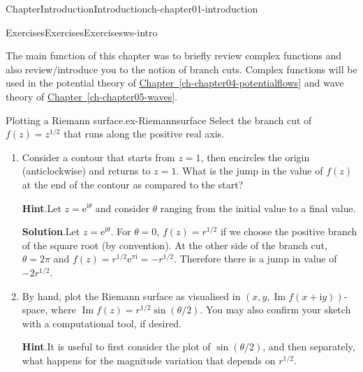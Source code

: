 \documentclass[oneside,10pt,]{book}
\newcommand{\blocktitlefont}{\relax}
\newcommand{\xreffont}{\relax}
\numberwithin{equation}{section}
\renewcommand*{\Im}{\operatorname{Im}}
\newcommand{\e}{\mathrm{e}}
\newcommand{\im}{\mathrm{i}}
\begin{document}
\begin{chapterptx}{Chapter}{Introduction}{}{Introduction}{}{}{ch-chapter01-introduction}
%
%
\typeout{************************************************}
\typeout{************************************************}
%
\begin{exercises-section}{Exercises}{Exercises}{}{Exercises}{}{}{ws-intro}
\begin{introduction}{}%
The main function of this chapter was to briefly review complex functions and also review\slash{}introduce you to the notion of branch cuts. Complex functions will be used in the potential theory of \hyperref[ch-chapter04-potentialflows]{Chapter~{\xreffont\ref{ch-chapter04-potentialflows}}} and wave theory of \hyperref[ch-chapter05-waves]{Chapter~{\xreffont\ref{ch-chapter05-waves}}}.%
\end{introduction}%
\begin{divisionexercise}{1}{Plotting a Riemann surface.}{}{ex-Riemannsurface}%
Select the branch cut of \(f(z) = z^{1/2}\) that runs along the positive real axis.%
\begin{enumerate}[font=\bfseries,label=(\alph*),ref=\alph*]%
\item{}Consider a contour that starts from \(z = 1\), then encircles the origin (anticlockwise) and returns to \(z = 1\). What is the jump in the value of \(f(z)\) at the end of the contour as compared to the start?%
\par\smallskip%
\noindent\textbf{\blocktitlefont Hint}.\hypertarget{ex-Riemannsurface-3-2}{}\quad{}Let \(z = \e^{\im \theta}\) and consider \(\theta\) ranging from the initial value to a final value.%
\par\smallskip%
\noindent\textbf{\blocktitlefont Solution}.\hypertarget{ex-Riemannsurface-3-3}{}\quad{}Let \(z = \e^{\im \theta}\). For \(\theta = 0\), \(f(z) = r^{1/2}\) if we choose the positive branch of the square root (by convention). At the other side of the branch cut, \(\theta = 2\pi\) and \(f(z) = r^{1/2} \e^{\pi \im} = -r^{1/2}\). Therefore there is a jump in value of \(-2r^{1/2}\).%
\item{}By hand, plot the Riemann surface as visualised in \((x, y, \Im f(x + \im y))\)-space, where \(\Im f(z) = r^{1/2} \sin(\theta/2)\). You may also confirm your sketch with a computational tool, if desired.%
\par\smallskip%
\noindent\textbf{\blocktitlefont Hint}.\hypertarget{ex-Riemannsurface-4-2}{}\quad{}It is useful to first consider the plot of \(\sin(\theta/2)\), and then separately, what happens for the magnitude variation that depends on \(r^{1/2}\).%
\par\smallskip%

\end{enumerate}
\end{divisionexercise}
\end{exercises-section}
\end{chapterptx}
\end{document}
